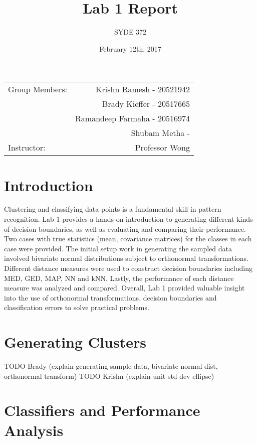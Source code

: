 \documentclass{article}
\title{Lab 1 Report} %
\author{SYDE 372} %
\date{February 12th, 2017} %
\begin{document}
\maketitle

\begin{center}
\begin{tabular}{l r}
Group Members: & Krishn Ramesh - 20521942 \\ %
& Brady Kieffer - 20517665 \\
& Ramandeep Farmaha - 20516974 \\
& Shubam Metha - \\
Instructor: & Professor Wong %
\end{tabular}
\end{center}



\section{Introduction}

Clustering and classifying data points is a fundamental skill in pattern recognition. Lab 1 provides a hands-on introduction to generating different kinds of decision boundaries, as well as evaluating and comparing their performance. Two cases with true statistics (mean, covariance matrices) for the classes in each case were provided. The initial setup work in generating the sampled data involved bivariate normal distributions subject to orthonormal transformations. Different distance measures were used to construct decision boundaries including MED, GED, MAP, NN and kNN. Lastly, the performance of each distance measure was analyzed and compared. Overall, Lab 1 provided valuable insight into the use of orthonormal transformations, decision boundaries and classification errors to solve practical problems.

\section{Generating Clusters}
TODO Brady (explain generating sample data, bivariate normal dist, orthonormal transform)
TODO Krishn (explain unit std dev ellipse)

\section{Classifiers and Performance Analysis}
\end{document}
